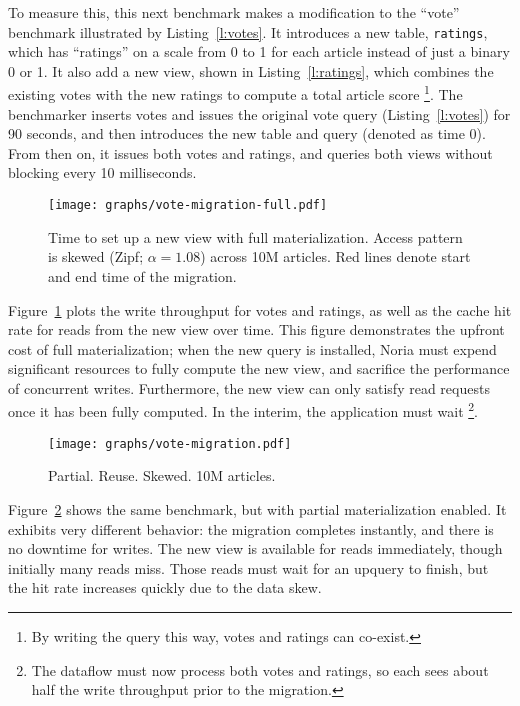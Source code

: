 To measure this, this next benchmark makes a modification to the ``vote''
benchmark illustrated by Listing~\ref{l:votes}. It introduces a new table,
\texttt{ratings}, which has ``ratings'' on a scale from 0 to 1 for each article
instead of just a binary 0 or 1. It also add a new view, shown in
Listing~\ref{l:ratings}, which combines the existing votes with the new ratings
to compute a total article score%
\footnote{By writing the query this way, votes and ratings can co-exist.}.
The benchmarker inserts votes and issues the original vote query
(Listing~\ref{l:votes}) for 90 seconds, and then introduces the new table and
query (denoted as time 0). From then on, it issues both votes and ratings, and
queries both views without blocking every 10 milliseconds.

\begin{figure}[t]
  \centering
  \texttt{[image: graphs/vote-migration-full.pdf]}
  \caption{Time to set up a new view with full materialization. Access pattern
  is skewed (Zipf; $\alpha = 1.08$) across 10M articles. Red lines denote start
  and end time of the migration.}
  \label{f:vote-migration-full}
\end{figure}

Figure~\ref{f:vote-migration-full} plots the write throughput for votes and
ratings, as well as the cache hit rate for reads from the new view over time.
This figure demonstrates the upfront cost of full materialization; when the new
query is installed, Noria must expend significant resources to fully compute the
new view, and sacrifice the performance of concurrent writes. Furthermore, the
new view can only satisfy read requests once it has been fully computed. In the
interim, the application must wait%
\footnote{The dataflow must now process both votes and ratings, so each sees
about half the write throughput prior to the migration.}.

\begin{figure}[t]
  \centering
  \texttt{[image: graphs/vote-migration.pdf]}
  \caption{Partial. Reuse. Skewed. 10M articles.}
  \label{f:vote-migration}
\end{figure}

Figure~\ref{f:vote-migration} shows the same benchmark, but with partial
materialization enabled. It exhibits very different behavior: the migration
completes instantly, and there is no downtime for writes. The new view is
available for reads immediately, though initially many reads miss. Those reads
must wait for an upquery to finish, but the hit rate increases quickly due to
the data skew.


